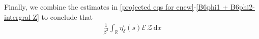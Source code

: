 \documentclass[10pt, reqno]{amsart}
\numberwithin{equation}{section}
\theoremstyle{definition}
\begin{document}
{\medskip
Finally, we combine the estimates in \eqref{projected eqs for enew}-\eqref{B6phi1 + B6phi2-intergral Z}
to conclude that
\begin{align} \label{Sw2 integral 2}
 \frac{1}{\beta^3}\int_{\mathbb R}\eta_\delta^\epsilon(s){\mathcal E}\,{\mathcal Z} \,{\mathrm d}x

\end{align}}
\end{document}
